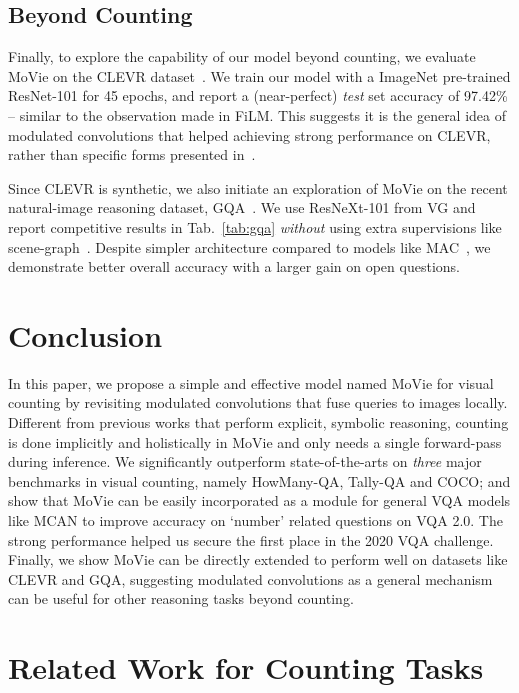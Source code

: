 \documentclass{article} \usepackage[dvipsnames,table]{xcolor}
\newcommand{\ours}[0]{MoVie\xspace}
\begin{document}
\subsection{Beyond Counting\label{sec:exp:beyond}}

Finally, to explore the capability of our model beyond counting, we evaluate \ours on the CLEVR dataset~\cite{johnson2017clevr}. We train our model with a ImageNet pre-trained ResNet-101 for 45 epochs, and report a (near-perfect) \emph{test} set accuracy of 97.42\% -- similar to the observation made in FiLM. This suggests it is the general idea of modulated convolutions that helped achieving strong performance on CLEVR, rather than specific forms presented in~\cite{perez2018film}.

Since CLEVR is synthetic, we also initiate an exploration of \ours on the recent natural-image reasoning dataset, GQA~\cite{hudson2019gqa}. We use ResNeXt-101 from VG and report competitive results in Tab.~\ref{tab:gqa} \emph{without} using extra supervisions like scene-graph~\cite{krishna2017visual}. Despite simpler architecture compared to models like MAC~\cite{hudson2018compositional}, we demonstrate better overall accuracy with a larger gain on open questions. 

\section{Conclusion}
In this paper, we propose a simple and effective model named \ours for visual counting by revisiting modulated convolutions that fuse queries to images locally. Different from previous works that perform explicit, symbolic reasoning, counting is done implicitly and holistically in \ours and only needs a single forward-pass during inference. We significantly outperform state-of-the-arts on \emph{three} major benchmarks in visual counting, namely HowMany-QA, Tally-QA and COCO; and show that \ours can be easily incorporated as a module for general VQA models like MCAN to improve accuracy on `number' related questions on VQA 2.0. The strong performance helped us secure the first place in the 2020 VQA challenge. Finally, we show \ours can be directly extended to perform well on datasets like CLEVR and GQA, suggesting modulated convolutions as a general mechanism can be useful for other reasoning tasks beyond counting.

\appendix

\section{Related Work for Counting Tasks\label{sec:related2}}
\end{document}
